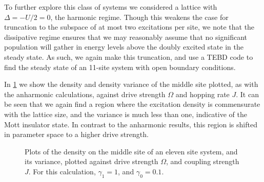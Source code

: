 To further explore this class of systems we considered a lattice with \(\Delta = -U/2 = 0\), the harmonic regime. Though this weakens the case for truncation to the subspace of at most two excitations per site, we note that the dissipative regime ensures that we may reasonably assume that no significant population will gather in energy levels above the doubly excited state in the steady state. As such, we again make this truncation, and use a TEBD code to find the steady state of an 11-site system with open boundary conditions.

In \cref{fig:dnlca5-1} we show the density and density variance of the middle site plotted, as with the anharmonic calculations, against drive strength \(\Omega\) and hopping rate \(J\). It can be seen that we again find a region where the excitation density is commensurate with the lattice size, and the variance is much less than one, indicative of the Mott insulator state. In contrast to the anharmonic results, this region is shifted in parameter space to a higher drive strength.

\begin{figure}[ht]
	 \hfill
	\caption{\label{fig:dnlca5-1} Plots of the density on the middle site of an eleven site system, and its variance, plotted against drive strength \(\Omega\), and coupling strength \(J\). For this calculation, \(\gamma_{1} = 1\), and \(\gamma_{0} = 0.1\).}
\end{figure} 

